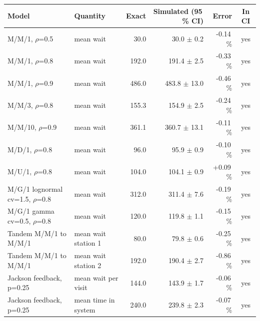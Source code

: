 \begin{tabular}{llrrrc}
\toprule
Model & Quantity & Exact & Simulated (95\,\% CI) & Error & In CI \\
\midrule
M/M/1, $\rho$=0.5 & mean wait & 30.0 & 30.0 $\pm$ 0.2 & -0.14\,\% & yes \\
M/M/1, $\rho$=0.8 & mean wait & 192.0 & 191.4 $\pm$ 2.5 & -0.33\,\% & yes \\
M/M/1, $\rho$=0.9 & mean wait & 486.0 & 483.8 $\pm$ 13.0 & -0.46\,\% & yes \\
M/M/3, $\rho$=0.8 & mean wait & 155.3 & 154.9 $\pm$ 2.5 & -0.24\,\% & yes \\
M/M/10, $\rho$=0.9 & mean wait & 361.1 & 360.7 $\pm$ 13.1 & -0.11\,\% & yes \\
M/D/1, $\rho$=0.8 & mean wait & 96.0 & 95.9 $\pm$ 0.9 & -0.10\,\% & yes \\
M/U/1, $\rho$=0.8 & mean wait & 104.0 & 104.1 $\pm$ 0.9 & +0.09\,\% & yes \\
M/G/1 lognormal cv=1.5, $\rho$=0.8 & mean wait & 312.0 & 311.4 $\pm$ 7.6 & -0.19\,\% & yes \\
M/G/1 gamma cv=0.5, $\rho$=0.8 & mean wait & 120.0 & 119.8 $\pm$ 1.1 & -0.15\,\% & yes \\
Tandem M/M/1 to M/M/1 & mean wait station 1 & 80.0 & 79.8 $\pm$ 0.6 & -0.25\,\% & yes \\
Tandem M/M/1 to M/M/1 & mean wait station 2 & 192.0 & 190.4 $\pm$ 2.7 & -0.86\,\% & yes \\
Jackson feedback, p=0.25 & mean wait per visit & 144.0 & 143.9 $\pm$ 1.7 & -0.06\,\% & yes \\
Jackson feedback, p=0.25 & mean time in system & 240.0 & 239.8 $\pm$ 2.3 & -0.07\,\% & yes \\
\bottomrule
\end{tabular}
